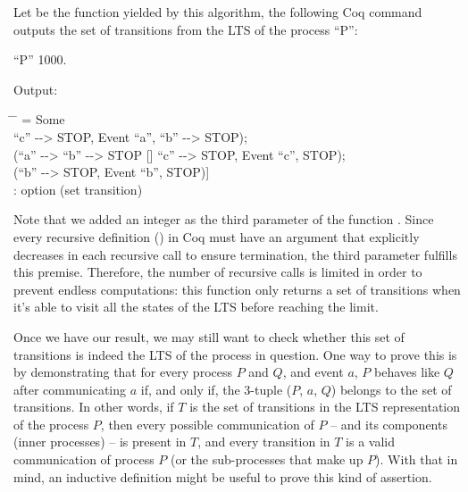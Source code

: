 Let  be the function yielded by this algorithm, the following Coq command outputs the set of transitions from the LTS of the process ``P'':

\begin{coqdoccode}
	\coqdocnoindent
	   ``P'' 1000.\coqdoceol
\end{coqdoccode}

\begin{flushleft}
	Output:
\end{flushleft}

\begin{tabbing}
	\hspace*{2.5em}\= \hspace*{2em} \= \kill
	= Some\\
	\>	[(``a'' -{}-> ``b'' -{}-> STOP [] ``c'' -{}-> STOP, Event ``a'', ``b'' -{}-> STOP);\\
	\>	(``a'' -{}-> ``b'' -{}-> STOP [] ``c'' -{}-> STOP, Event ``c'', STOP);\\
	\>	(``b'' -{}-> STOP, Event ``b'', STOP)]\\
	: option (set transition)
\end{tabbing}

Note that we added an integer as the third parameter of the function . Since every recursive definition () in Coq must have an argument that explicitly decreases in each recursive call to ensure termination, the third parameter fulfills this premise. Therefore, the number of recursive calls is limited in order to prevent endless computations: this function only returns a set of transitions when it's able to visit all the states of the LTS before reaching the limit.

Once we have our result, we may still want to check whether this set of transitions is indeed the LTS of the process in question. One way to prove this is by demonstrating that for every process $ P $ and $ Q $, and event $ a $, $ P $ behaves like $ Q $ after communicating $ a $ if, and only if, the 3-tuple ($ P $, $ a $, $ Q $) belongs to the set of transitions. In other words, if $ T $ is the set of transitions in the LTS representation of the process $ P $, then every possible communication of $ P $ -- and its components (inner processes) -- is present in $ T $, and every transition in $ T $ is a valid communication of process $ P $ (or the sub-processes that make up $ P $). With that in mind, an inductive definition might be useful to prove this kind of assertion.

